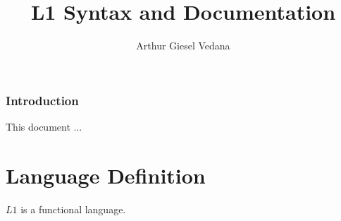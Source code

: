 \documentclass{report}
\author{Arthur Giesel Vedana}
\title{L1 Syntax and Documentation}
\begin{document}
\maketitle
{}
\newpage

\tableofcontents
\newpage

\section*{Introduction}
This document ...

\newpage
{}
\part{Language Definition}

$L1$ is a functional language.
\end{document}
